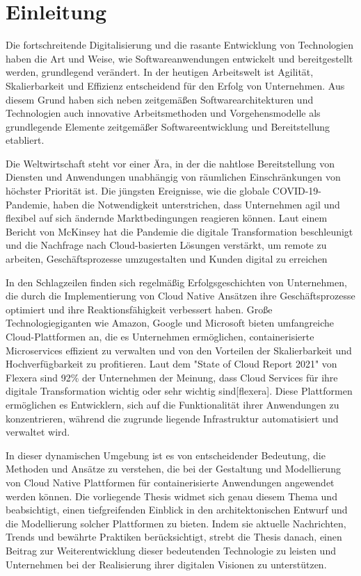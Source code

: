 \newpage
\section{Einleitung}
Die fortschreitende Digitalisierung und die rasante Entwicklung von Technologien haben die Art und Weise, wie Softwareanwendungen entwickelt und bereitgestellt werden, grundlegend verändert. In der heutigen Arbeitswelt ist Agilität, Skalierbarkeit und Effizienz entscheidend für den Erfolg von Unternehmen. Aus diesem Grund haben sich neben zeitgemäßen Softwarearchitekturen und Technologien auch innovative Arbeitsmethoden und Vorgehensmodelle als grundlegende Elemente zeitgemäßer Softwareentwicklung und Bereitstellung etabliert.

Die Weltwirtschaft steht vor einer Ära, in der die nahtlose Bereitstellung von Diensten und Anwendungen unabhängig von räumlichen Einschränkungen von höchster Priorität ist. Die jüngsten Ereignisse, wie die globale COVID-19-Pandemie, haben die Notwendigkeit unterstrichen, dass Unternehmen agil und flexibel auf sich ändernde Marktbedingungen reagieren können. Laut einem Bericht von McKinsey hat die Pandemie die digitale Transformation beschleunigt und die Nachfrage nach Cloud-basierten Lösungen verstärkt, um remote zu arbeiten, Geschäftsprozesse umzugestalten und Kunden digital zu erreichen\cite{McKinsey_2020:online}

In den Schlagzeilen finden sich regelmäßig Erfolgsgeschichten von Unternehmen, die durch die Implementierung von Cloud Native Ansätzen ihre Geschäftsprozesse optimiert und ihre Reaktionsfähigkeit verbessert haben. Große Technologiegiganten wie Amazon, Google und Microsoft bieten umfangreiche Cloud-Plattformen an, die es Unternehmen ermöglichen, containerisierte Microservices effizient zu verwalten und von den Vorteilen der Skalierbarkeit und Hochverfügbarkeit zu profitieren. Laut dem "State of Cloud Report 2021" von Flexera sind 92\% der Unternehmen der Meinung, dass Cloud Services für ihre digitale Transformation wichtig oder sehr wichtig sind[flexera]. Diese Plattformen ermöglichen es Entwicklern, sich auf die Funktionalität ihrer Anwendungen zu konzentrieren, während die zugrunde liegende Infrastruktur automatisiert und verwaltet wird.

In dieser dynamischen Umgebung ist es von entscheidender Bedeutung, die Methoden und Ansätze zu verstehen, die bei der Gestaltung und Modellierung von Cloud Native Plattformen für containerisierte Anwendungen angewendet werden können. Die vorliegende Thesis widmet sich genau diesem Thema und beabsichtigt, einen tiefgreifenden Einblick in den architektonischen Entwurf und die Modellierung solcher Plattformen zu bieten. Indem sie aktuelle Nachrichten, Trends und bewährte Praktiken berücksichtigt, strebt die Thesis danach, einen Beitrag zur Weiterentwicklung dieser bedeutenden Technologie zu leisten und Unternehmen bei der Realisierung ihrer digitalen Visionen zu unterstützen.

